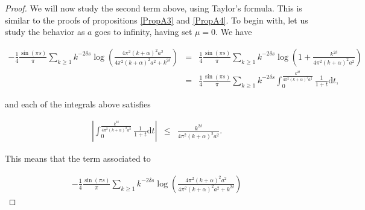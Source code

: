 \documentclass{jams-l}
\theoremstyle{definition}
\theoremstyle{remark}
\numberwithin{equation}{section}
\begin{document}
\begin{proof}
                        \noindent We will now study the second term above, using Taylor's formula. This is similar to the proofs of propositions \ref{PropA3} and \ref{PropA4}. To begin with, let us study the behavior as $a$ goes to infinity, having set $\mu = 0$. We have
                        
                        \[ \begin{array}{lll}
                                \scriptstyle - \frac{1}{4} \frac{\sin \left( \pi s \right)}{\pi} \sum\limits_{k \geqslant 1} k^{-2 \delta s} \log \left( \frac{4 \pi^2 \left( k + \alpha \right)^2 a^2}{4 \pi^2 \left( k + \alpha \right)^2 a^2 + k^{2 \delta}} \right) & \scriptstyle = & \scriptstyle \frac{1}{4} \frac{\sin \left( \pi s \right)}{\pi} \sum\limits_{k \geqslant 1} k^{-2 \delta s} \log \left( 1 + \frac{k^{2 \delta}}{4 \pi^2 \left( k + \alpha \right)^2 a^2} \right) \\[0.5em]
                                
                                & \scriptstyle = & \scriptstyle \frac{1}{4} \frac{\sin \left( \pi s \right)}{\pi} \sum\limits_{k \geqslant 1} k^{-2 \delta s} \int_0^{\frac{k^{2 \delta}}{4 \pi^2 \left( k + \alpha \right)^2 a^2}} \frac{1}{1+t} \mathrm{d}t,
                            \end{array} \]
                        
                        \noindent and each of the integrals above satisfies
                        
                        \[ \begin{array}{lll}
                                \left \vert \int_0^{\frac{k^{2 \delta}}{4 \pi^2 \left( k + \alpha \right)^2 a^2}} \frac{1}{1+t} \mathrm{d}t \right \vert & \scriptstyle \leqslant & \frac{k^{2 \delta}}{4 \pi^2 \left( k + \alpha \right)^2 a^2}.
                            \end{array} \]
                        
                        \noindent This means that the term associated to
                        
                        \[ \begin{array}{c}
                                - \frac{1}{4} \frac{\sin \left( \pi s \right)}{\pi} \sum\limits_{k \geqslant 1} k^{-2 \delta s} \log \left( \frac{4 \pi^2 \left( k + \alpha \right)^2 a^2}{4 \pi^2 \left( k + \alpha \right)^2 a^2 + k^{2 \delta}} \right)
                            \end{array} \]
                        

\end{proof}
\end{document}

